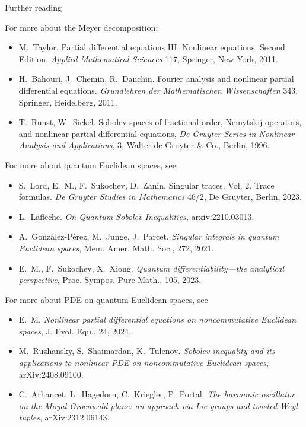 \documentclass{beamer}
\numberwithin{equation}{section}
\theoremstyle{plain}
\theoremstyle{plain}
\theoremstyle{definition}
\theoremstyle{plain}
\theoremstyle{plain}
\theoremstyle{definition}
\begin{document}
\begin{frame}
\end{frame}


\begin{frame}{Further reading}
\tiny{
    For more about the Meyer decomposition:
    \begin{itemize}
        \item{} M.~Taylor. Partial differential equations III. Nonlinear equations. Second Edition. \textit{Applied Mathematical Sciences} 117, Springer, New York, 2011.
        \item{} H.~Bahouri, J.~Chemin, R.~Danchin. Fourier analysis and nonlinear partial differential equations. \textit{Grundlehren der Mathematischen Wissenschaften} 343, Springer, Heidelberg, 2011.
        \item{} T.~Runst, W.~Sickel. {Sobolev spaces of fractional order, {N}emytskij operators, and nonlinear partial differential equations}, \textit{De Gruyter Series in Nonlinear Analysis and Applications}, {3}, {Walter de Gruyter \& Co., Berlin}, {1996}.
    \end{itemize}
    For more about quantum Euclidean spaces, see
    \begin{itemize}
        \item{} S.~Lord, E.~M., F.~Sukochev, D.~Zanin. {Singular traces. {V}ol. 2. {T}race formulas}. \textit{De Gruyter Studies in Mathematics} {46/2}, De Gruyter, Berlin, 2023.
        \item{} L.~Lafleche. \textit{{On {Q}uantum {S}obolev {I}nequalities},} {arxiv:2210.03013}.
        \item{} A.~Gonz\'{a}lez-P\'{e}rez, M.~Junge, J.~Parcet. \textit{Singular integrals in quantum {E}uclidean spaces}, {Mem. Amer. Math. Soc.}, {272}, {2021}.
        \item{} E.~M., F.~Sukochev, X.~Xiong. \textit{Quantum differentiability---the analytical perspective}, {Proc. Sympos. Pure Math.}, {105}, 2023.
    \end{itemize}
    For more about PDE on quantum Euclidean spaces, see
    \begin{itemize}
        \item{} E.~M. \textit{Nonlinear partial differential equations on noncommutative {E}uclidean spaces}, {J. Evol. Equ.}, {24}, {2024},
        \item{} M.~Ruzhansky, S.~Shaimardan, K.~Tulenov. \textit{Sobolev inequality and its applications to nonlinear PDE on noncommutative Euclidean spaces}, arXiv:2408.09100.
        \item{} C.~Arhancet, L.~Hagedorn, C.~Kriegler, P.~Portal. \textit{The harmonic oscillator on the Moyal-Groenwald plane: an approach via Lie groups and twisted Weyl tuples}, arXiv:2312.06143.
    \end{itemize}
}
\end{frame}
\end{document}
